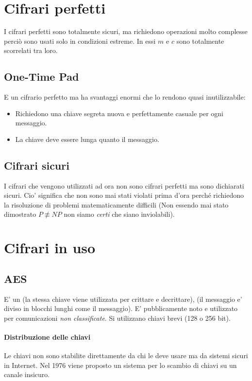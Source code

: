 \section{Cifrari perfetti}
I cifrari perfetti sono totalmente sicuri, ma richiedono operazioni molto complesse perciò sono usati solo in condizioni estreme.
In essi $m$ e $c$ sono totalmente scorrelati tra loro.
\subsection{One-Time Pad}
E un cifrario perfetto ma ha svantaggi enormi che lo rendono quasi inutilizzabile:
\begin{itemize}
    \item Richiedono una chiave segreta nuova e perfettamente casuale per ogni messaggio.
    \item La chiave deve essere lunga quanto il messaggio.
\end{itemize}
\subsection{Cifrari sicuri}
I cifrari che vengono utilizzati ad ora non sono cifrari perfetti ma sono dichiarati sicuri. Cio' significa che non sono mai stati violati prima d'ora perché richiedono la risoluzione di problemi matematicamente difficili (Non essendo mai stato dimostrato $P \not\equiv NP$ non siamo \textit{certi} che siano inviolabili).
\section{Cifrari in uso}
\subsection{AES}
E' un  (la stessa chiave viene utilizzata per crittare e decrittare),  (il messaggio e' diviso in blocchi lunghi come il messaggio).
E' pubblicamente noto e utilizzato per comunicazioni \textit{non classificate}.
Si utilizzano chiavi brevi (128 o 256 bit).
\paragraph{Distribuzione delle chiavi}
Le chiavi non sono stabilite direttamente da chi le deve usare ma da sistemi sicuri in Internet.
Nel 1976 viene proposto un sistema per lo scambio di chiavi su un canale insicuro.
